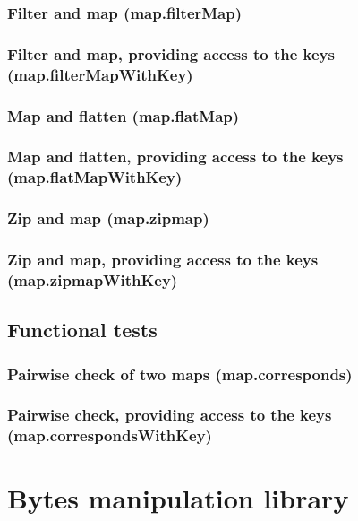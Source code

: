 \documentclass{article}
\theoremstyle{definition}
\begin{document}
\subsubsection{Filter and map (map.filterMap)}

\subsubsection{Filter and map, providing access to the keys (map.filterMapWithKey)}

\subsubsection{Map and flatten (map.flatMap)}

\subsubsection{Map and flatten, providing access to the keys (map.flatMapWithKey)}

\subsubsection{Zip and map (map.zipmap)}

\subsubsection{Zip and map, providing access to the keys (map.zipmapWithKey)}

\subsection{Functional tests}

\subsubsection{Pairwise check of two maps (map.corresponds)}

\subsubsection{Pairwise check, providing access to the keys (map.correspondsWithKey)}

\pagebreak
\section{Bytes manipulation library}
\end{document}
